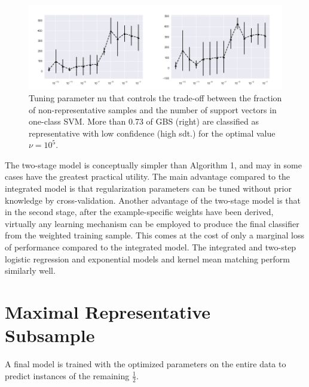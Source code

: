\begin{figure}[ht]
\centering
   \includegraphics[scale=0.38,angle=0]{fig/occfigure}
\captionsetup{width= 380pt}
\caption{Tuning parameter nu that controls the trade-oﬀ between the fraction of non-representative samples and the number of support vectors in one-class SVM. More than 0.73 of GBS (right) are classiﬁed as representative with low conﬁdence (high sdt.) for the optimal value \( \nu = 10^5\).}
   \label{fig:Ng1} 
\end{figure}

The two-stage model is conceptually simpler than Algorithm 1, and may in some cases have the greatest practical utility. The main advantage compared to the integrated model is that regularization parameters can be tuned without prior knowledge by cross-validation. Another advantage of the two-stage model is that in the second stage, after the example-speciﬁc weights have been derived, virtually any learning mechanism can be employed to produce the ﬁnal classiﬁer from the weighted training sample. This comes at the cost of only a marginal loss of performance compared to the integrated model. The integrated and two-step logistic regression and exponential models and kernel mean matching perform similarly well.

\section{Maximal Representative Subsample}

A final model is trained with the optimized parameters on the entire data to predict instances of the remaining \(\frac{1}{2}\).


